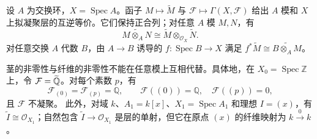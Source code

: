 \begin{theorem}\label{b3:thm:affine-quasicoherent-equivalence}
	设 \(A\) 为交换环，\(X=\operatorname{Spec}A\)。函子 \(M\mapsto\widetilde M\) 与 \(\mathcal F\mapsto\Gamma(X,\mathcal F)\) 给出 \(A\) 模和 \(X\) 上拟凝聚层的互逆等价。它们保持正合列；对任意 \(A\) 模 \(M,N\)，有
	\[
		\widetilde{M\otimes_A N}\cong \widetilde M\otimes_{\mathcal O_X}\widetilde N.
	\]
	对任意交换 \(A\) 代数 \(B\)，由 \(A\rightarrow B\) 诱导的 \(f:\operatorname{Spec}B\rightarrow X\) 满足 \(f^*\widetilde M\cong\widetilde{B\otimes_AM}\)。

	茎的非零性与纤维的非零性不能在任意模上互相代替。具体地，在 \(X_0=\operatorname{Spec}\mathbb Z\) 上，令 \(\mathcal F=\widetilde{\vphantom{Q}\mathbb Q}\)。对每个素数 \(p\)，有
	\[
		\mathcal F_{(0)}=\mathcal F_{(p)}=\mathbb Q,\qquad \mathcal F((0))=\mathbb Q,\quad \mathcal F((p))=0,
	\]
	且 \(\mathcal F\) 不凝聚。 此外，对域 \(k\)、\(A_1=k[x]\)、\(X_1=\operatorname{Spec}A_1\) 和理想 \(I=(x)\)，有 \(\widetilde I\cong\mathcal O_{X_1}\)；自然包含 \(\widetilde I\to\mathcal O_{X_1}\) 是层的单射，但它在原点 \((x)\) 的纤维映射为 \(k\xrightarrow{0}k\)。
\end{theorem}
